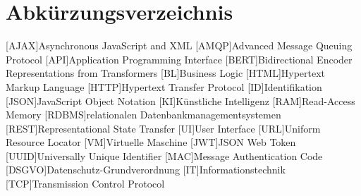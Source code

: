 \section{Abkürzungsverzeichnis}
\begin{acronym}
	[AJAX]{Asynchronous JavaScript and XML}
	[AMQP]{Advanced Message Queuing Protocol}
	[API]{Application Programming Interface}
	[BERT]{Bidirectional Encoder Representations from Transformers}
	[BL]{Business Logic}
	[HTML]{Hypertext Markup Language}
	[HTTP]{Hypertext Transfer Protocol}
	[ID]{Identifikation}
	[JSON]{JavaScript Object Notation}
	[KI]{Künstliche Intelligenz}
	[RAM]{Read-Access Memory}
	[RDBMS]{relationalen Datenbankmanagementsystemen}
	[REST]{Representational State Transfer}
	[UI]{User Interface}
	[URL]{Uniform Resource Locator}
	[VM]{Virtuelle Maschine}
	[JWT]{JSON Web Token}
	[UUID]{Universally Unique Identifier}
	[MAC]{Message Authentication Code}
	[DSGVO]{Datenschutz-Grundverordnung}
	[IT]{Informationstechnik}
	[TCP]{Transmission Control Protocol}
\end{acronym}
